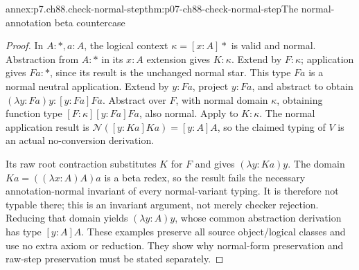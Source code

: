 \begin{annexitem}{annex:p7.ch88.check-normal-step}{thm:p07-ch88-check-normal-step}{The normal-annotation beta countercase}
\begin{proof}
In \(A:\ast,a:A\), the logical context \(\kappa=[x:A]\ast\)
is valid and normal. Abstraction from \(A:\ast\) in its
\(x:A\) extension gives \(K:\kappa\). Extend by
\(F:\kappa\); application gives \(Fa:\ast\), since its
result is the unchanged normal star. This type \(Fa\) is a normal
neutral application. Extend by \(y:Fa\), project \(y:Fa\), and
abstract to obtain \((\lambda y:Fa)y:[y:Fa]Fa\).
Abstract over \(F\), with normal domain \(\kappa\), obtaining
function type \([F:\kappa][y:Fa]Fa\), also normal. Apply to
\(K:\kappa\). The normal application result is
\(\mathcal N([y:Ka]Ka)=[y:A]A\), so the claimed typing of
\(V\) is an actual no-conversion derivation.

Its raw root contraction substitutes \(K\) for \(F\) and gives
\((\lambda y:Ka)y\). The domain \(Ka=((\lambda x:A)A)a\)
is a beta redex, so the result fails the necessary annotation-normal
invariant of every normal-variant typing. It is therefore not typable
there; this is an invariant argument, not merely checker rejection.
Reducing that domain yields \((\lambda y:A)y\), whose common
abstraction derivation has type \([y:A]A\). These examples preserve
all source object/logical classes and use no extra axiom or reduction.
They show why normal-form preservation and raw-step preservation must
be stated separately.
\end{proof}
\end{annexitem}
